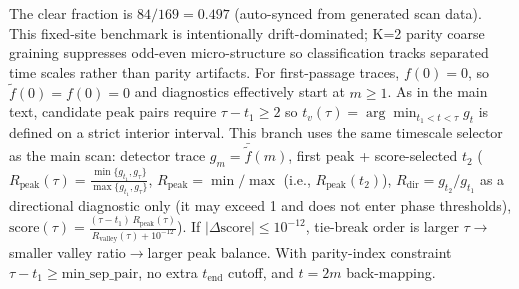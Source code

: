 The clear fraction is $84/169=0.497$ (auto-synced from generated scan data). This fixed-site benchmark is intentionally drift-dominated; K=2 parity coarse graining suppresses odd-even micro-structure so classification tracks separated time scales rather than parity artifacts. For first-passage traces, $f(0)=0$, so $\widetilde f(0)=f(0)=0$ and diagnostics effectively start at $m\ge1$. As in the main text, candidate peak pairs require $\tau-t_1\ge 2$ so $t_v(\tau)=\arg\min_{t_1<t<\tau}g_t$ is defined on a strict interior interval. This branch uses the same timescale selector as the main scan: detector trace $g_m=\bar{\widetilde f}(m)$, first peak + score-selected $t_2$ ($R_{\mathrm{peak}}(\tau)=\frac{\min\{g_{t_1},g_{\tau}\}}{\max\{g_{t_1},g_{\tau}\}}$, $R_{\mathrm{peak}}=\min/\max$ (i.e., $R_{\mathrm{peak}}(t_2)$), $R_{\mathrm{dir}}=g_{t_2}/g_{t_1}$ as a directional diagnostic only (it may exceed 1 and does not enter phase thresholds), $\mathrm{score}(\tau)=\frac{(\tau-t_1)\,R_{\mathrm{peak}}(\tau)}{R_{\mathrm{valley}}(\tau)+10^{-12}}$). If $|\Delta\mathrm{score}|\le10^{-12}$, tie-break order is larger $\tau\rightarrow$smaller valley ratio$\rightarrow$larger peak balance. With parity-index constraint $\tau-t_1\ge\mathrm{min\_sep\_pair}$, no extra $t_{\mathrm{end}}$ cutoff, and $t=2m$ back-mapping.
